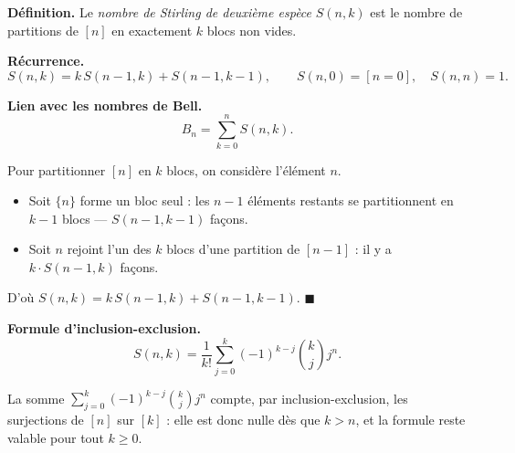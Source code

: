 \decsep{}


\begin{tcolorbox}[thmbox]
  \textbf{Définition.}\enspace{}
  Le \emph{nombre de Stirling de deuxième espèce} $S(n,k)$ est le nombre de
  partitions de $[n]$ en exactement $k$ blocs non vides.

  \medskip
  \textbf{Récurrence.}\enspace{}
  \[
    S(n,k) = k\,S(n-1,k) + S(n-1,k-1),
    \qquad S(n,0)=[n=0],\quad S(n,n)=1.
  \]

  \medskip
  \textbf{Lien avec les nombres de Bell.}\enspace
  \[
    B_n = \sum_{k=0}^{n} S(n,k).
  \]
\end{tcolorbox}


\begin{mdframed}[style=proofbar]
  Pour partitionner $[n]$ en $k$ blocs, on considère l'élément $n$.
  \begin{itemize}
    \item Soit $\{n\}$ forme un bloc seul : les $n-1$ éléments restants
          se partitionnent en $k-1$ blocs — $S(n-1,k-1)$ façons.
    \item Soit $n$ rejoint l'un des $k$ blocs d'une partition de $[n-1]$ :
          il y a $k\cdot S(n-1,k)$ façons.
  \end{itemize}
  D'où $S(n,k) = k\,S(n-1,k) + S(n-1,k-1)$. $\blacksquare$
\end{mdframed}


\begin{tcolorbox}[thmbox]
  \textbf{Formule d'inclusion-exclusion.}\enspace
  \[
    S(n,k) = \frac{1}{k!}\sum_{j=0}^{k}{(-1)}^{k-j}\binom{k}{j}j^n.
  \]

  \medskip
  La somme $\sum_{j=0}^{k}{(-1)}^{k-j}\binom{k}{j}j^n$ compte, par
  inclusion-exclusion, les surjections de $[n]$ sur $[k]$ : elle est donc
  nulle dès que $k > n$, et la formule reste valable pour tout $k \geq 0$.
\end{tcolorbox}

\decsep{}


